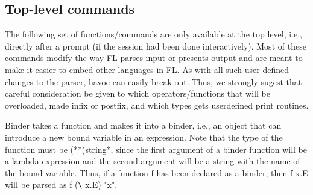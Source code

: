 \subsection{Top-level commands}

The following set of functions/commands are only available at the
top level, i.e., directly after a prompt (if the session had been done
interactively).
Most of these commands modify the way FL parses input or presents output
and are meant to make it easier to embed other languages in FL.
As with all such user-defined changes to the parser, havoc can easily
break out. 
Thus, we strongly sugest that careful consideration be given
to which operators/functions that will be overloaded, made infix or
postfix, and which types gets userdefined print routines.
\begin{description}
Binder takes a function and makes it into a binder, i.e., an object that
can introduce a new bound variable in an expression.
Note that the type of the function must be (*\funarrow **)\funarrow string\funarrow **,
since the first argument of a binder function will be a lambda expression
and the second argument will be a string with the name of the bound variable.
Thus, if a function f has been declared as a binder, then
f x.E will be parsed as f (\protect\verb!\! x.E) "x".
\end{description}
